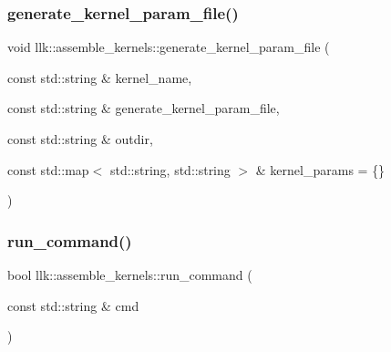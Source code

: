 \mbox{\label{namespacellk_1_1assemble__kernels_a188966c139ddbc16fe641bcb1fc73daa}} 
\subsubsection{\texorpdfstring{generate\+\_\+kernel\+\_\+param\+\_\+file()}{generate\_kernel\_param\_file()}}
{\footnotesize\ttfamily void llk\+::assemble\+\_\+kernels\+::generate\+\_\+kernel\+\_\+param\+\_\+file (\begin{DoxyParamCaption}\item[{const std\+::string \&}]{kernel\+\_\+name,  }\item[{const std\+::string \&}]{generate\+\_\+kernel\+\_\+param\+\_\+file,  }\item[{const std\+::string \&}]{outdir,  }\item[{const std\+::map$<$ std\+::string, std\+::string $>$ \&}]{kernel\+\_\+params = {\ttfamily \{\}} }\end{DoxyParamCaption})}

\mbox{\label{namespacellk_1_1assemble__kernels_a5216f630a6ff0cb75b43ebf8adf1a93e}} 
\subsubsection{\texorpdfstring{run\+\_\+command()}{run\_command()}}
{\footnotesize\ttfamily bool llk\+::assemble\+\_\+kernels\+::run\+\_\+command (\begin{DoxyParamCaption}\item[{const std\+::string \&}]{cmd }\end{DoxyParamCaption})}

